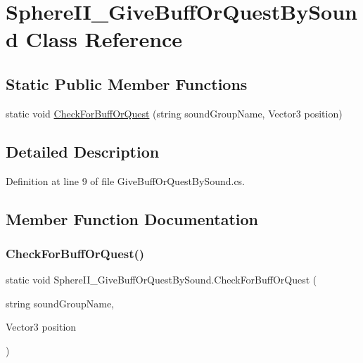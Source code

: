 \hypertarget{class_sphere_i_i___give_buff_or_quest_by_sound}{}\section{Sphere\+I\+I\+\_\+\+Give\+Buff\+Or\+Quest\+By\+Sound Class Reference}
\label{class_sphere_i_i___give_buff_or_quest_by_sound}
\subsection*{Static Public Member Functions}
\begin{DoxyCompactItemize}
\item 
static void \mbox{\hyperlink{class_sphere_i_i___give_buff_or_quest_by_sound_ac5a1755a038e56f94dd0d097b37731ea}{Check\+For\+Buff\+Or\+Quest}} (string sound\+Group\+Name, Vector3 position)
\end{DoxyCompactItemize}


\subsection{Detailed Description}


Definition at line 9 of file Give\+Buff\+Or\+Quest\+By\+Sound.\+cs.



\subsection{Member Function Documentation}
\mbox{\label{class_sphere_i_i___give_buff_or_quest_by_sound_ac5a1755a038e56f94dd0d097b37731ea}} 
\subsubsection{\texorpdfstring{CheckForBuffOrQuest()}{CheckForBuffOrQuest()}}
{\footnotesize\ttfamily static void Sphere\+I\+I\+\_\+\+Give\+Buff\+Or\+Quest\+By\+Sound.\+Check\+For\+Buff\+Or\+Quest (\begin{DoxyParamCaption}\item[{string}]{sound\+Group\+Name,  }\item[{Vector3}]{position }\end{DoxyParamCaption})\hspace{0.3cm}{\ttfamily [static]}}



